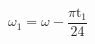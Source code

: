 \documentclass[12pt]{article}
\begin{document}
\begin{displaymath}
\omega_{1}=\omega-\frac{\pi \mathrm{t}_{1}}{24}
\end{displaymath}
\end{document}
